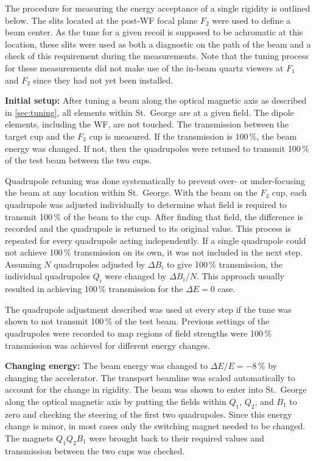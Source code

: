 The procedure for measuring the energy acceptance of a single rigidity
is outlined below. The slits located at the post-WF focal plane $F_2$
were used to define a beam center. As the tune for a given recoil is
supposed to be achromatic at this location, these slits were used as
both a diagnostic on the path of the beam and a check of this
requirement during the measurements. Note that the tuning process for
these measurements did not make use of the in-beam quartz viewers at
$F_1$ and $F_2$ since they had not yet been installed.

\textbf{Initial setup:}
After tuning a beam along the optical magnetic axis as described in
\ref{sec:tuning}, all elements within St.\ George are at a given field.
The dipole elements, including the WF, are not touched. The transmission
between the target cup and the $F_3$ cup is measured. If the
transmission is 100\,\%, the beam energy was changed. If not, then the
quadrupoles were retuned to transmit 100\,\% of the test beam between
the two cups.

Quadrupole retuning was done systematically to prevent over- or
under-focusing the beam at any location within St.\ George. With the
beam on the $F_3$ cup, each quadrupole was adjusted individually to
determine what field is required to transmit 100\,\% of the beam to the
cup. After finding that field, the difference is recorded and the
quadrupole is returned to its original value. This process is repeated
for every quadrupole acting independently. If a single quadrupole could
not achieve 100\,\% transmission on its own, it was not included in the
next step. Assuming $N$ quadrupoles adjusted by $\Delta B_i$ to give
100\,\% transmission, the individual quadrupoles $Q_i$ were changed by
$\Delta B_i / N$. This approach usually resulted in achieving 100\,\%
transmission for the $\Delta E = 0$ case.

The quadrupole adjustment described was used at every step if the tune
was shown to not transmit 100\,\% of the test beam. Previous settings of
the quadrupoles were recorded to map regions of field strengths were
100\,\% transmission was achieved for different energy changes.

\textbf{Changing energy:}
The beam energy was changed to $\Delta E/E = -8$\,\% by changing the
accelerator. The transport beamline was scaled automatically to account
for the change in rigidity. The beam was shown to enter into St.\ George
along the optical magnetic axis by putting the fields within $Q_1$,
$Q_2$, and $B_1$ to zero and checking the steering of the first two
quadrupoles. Since this energy change is minor, in most cases only the
switching magnet needed to be changed. The magnets $Q_1Q_2B_1$ were
brought back to their required values and transmission between the two
cups was checked.

